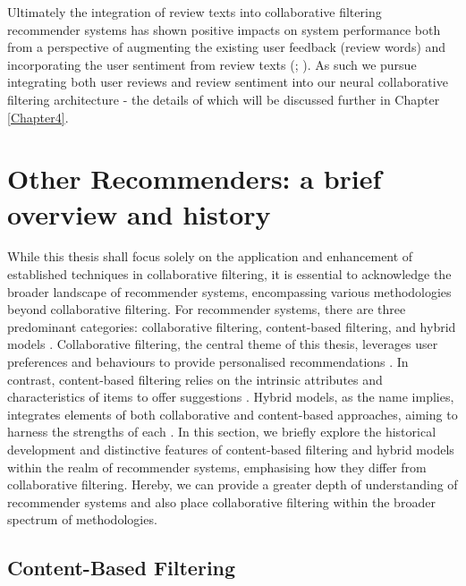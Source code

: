Ultimately the integration of review texts into collaborative filtering recommender systems has shown positive impacts on system performance both from a perspective of augmenting the existing user feedback (review words) and incorporating the user sentiment from review texts (\cite{dang2020sentiment}; \cite{hernandez2019comparative}). As such we pursue integrating both user reviews and review sentiment into our neural collaborative filtering architecture - the details of which will be discussed further in Chapter \ref{Chapter4}.


\section{Other Recommenders: a brief overview and history}
\label{sec:2 Other Recommenders: a brief overview and history}

While this thesis shall focus solely on the application and enhancement of established techniques in collaborative filtering, it is essential to acknowledge the broader landscape of recommender systems, encompassing various methodologies beyond collaborative filtering. For recommender systems, there are three predominant categories: collaborative filtering, content-based filtering, and hybrid models \cite{sarwar2000analysis}. Collaborative filtering, the central theme of this thesis, leverages user preferences and behaviours to provide personalised recommendations \cite{smith2017two}. In contrast, content-based filtering relies on the intrinsic attributes and characteristics of items to offer suggestions \cite{lops2011content}. Hybrid models, as the name implies, integrates elements of both collaborative and content-based approaches, aiming to harness the strengths of each \cite{thorat2015survey}. In this section, we briefly explore the historical development and distinctive features of content-based filtering and hybrid models within the realm of recommender systems, emphasising how they differ from collaborative filtering. Hereby, we can provide a greater depth of understanding of recommender systems and also place collaborative filtering within the broader spectrum of methodologies.



\subsection{Content-Based Filtering}
\label{subsec:2 Content-Based Filtering}

